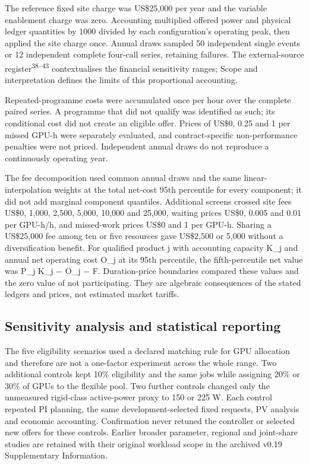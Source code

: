 \documentclass[10pt,a4paper]{article}
\begin{document}
The reference fixed site charge was US\$25,000 per year and the variable enablement charge was zero. Accounting multiplied offered power and physical ledger quantities by 1000 divided by each configuration’s operating peak, then applied the site charge once. Annual draws sampled 50 independent single events or 12 independent complete four-call series, retaining failures. The external-source register\textsuperscript{38–43} contextualises the financial sensitivity ranges; Scope and interpretation defines the limits of this proportional accounting.


Repeated-programme costs were accumulated once per hour over the complete paired series. A programme that did not qualify was identified as such; its conditional cost did not create an eligible offer. Prices of US\$0, 0.25 and 1 per missed GPU-h were separately evaluated, and contract-specific non-performance penalties were not priced. Independent annual draws do not reproduce a continuously operating year.


The fee decomposition used common annual draws and the same linear-interpolation weights at the total net-cost 95th percentile for every component; it did not add marginal component quantiles. Additional screens crossed site fees US\$0, 1,000, 2,500, 5,000, 10,000 and 25,000, waiting prices US\$0, 0.005 and 0.01 per GPU-h/h, and missed-work prices US\$0 and 1 per GPU-h. Sharing a US\$25,000 fee among ten or five resources gave US\$2,500 or 5,000 without a diversification benefit. For qualified product j with accounting capacity K\_j and annual net operating cost O\_j at its 95th percentile, the fifth-percentile net value was P\_j K\_j − O\_j − F. Duration-price boundaries compared these values and the zero value of not participating. They are algebraic consequences of the stated ledgers and prices, not estimated market tariffs.


\subsection*{Sensitivity analysis and statistical reporting}

The five eligibility scenarios used a declared matching rule for GPU allocation and therefore are not a one-factor experiment across the whole range. Two additional controls kept 10\% eligibility and the same jobs while assigning 20\% or 30\% of GPUs to the flexible pool. Two further controls changed only the unmeasured rigid-class active-power proxy to 150 or 225 W. Each control repeated PI planning, the same development-selected fixed requests, PV analysis and economic accounting. Confirmation never retuned the controller or selected new offers for these controls. Earlier broader parameter, regional and joint-share studies are retained with their original workload scope in the archived v0.19 Supplementary Information.
\end{document}

